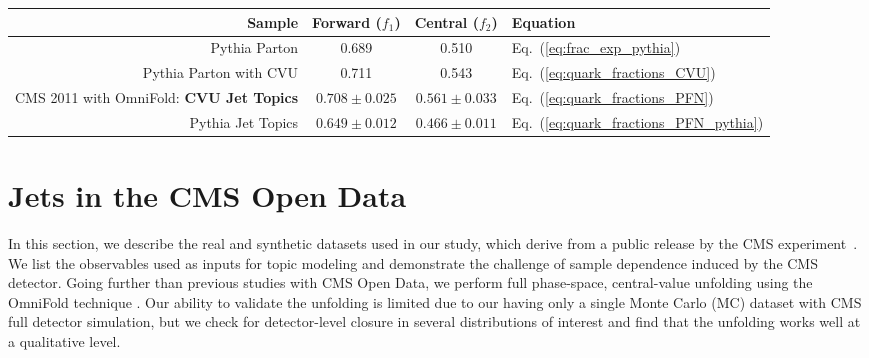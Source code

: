 \documentclass[aps,prd,twocolumn,preprintnumbers,nofootinbib,longbibliography,floatfix]{revtex4-1}
\DeclareRobustCommand{\App}[1]{App.~\ref{#1}}
\DeclareRobustCommand{\Eq}[1]{Eq.~(\ref{#1})}
\newcommand{\Pythia}{{\sc Pythia}\xspace}
\newcommand{\OmniFold}{{\sc OmniFold}\xspace}
\begin{document}
\begin{table*}
%
\renewcommand\arraystretch{1.1}
\setlength{\tabcolsep}{12pt}
\begin{tabular}{r c c l}
\hline
\hline
Sample & Forward ($f_1$) & Central ($f_2$) & Equation\\
 \hline
 \hline
\Pythia Parton & 0.689 & 0.510 & \Eq{eq:frac_exp_pythia}\\
\Pythia Parton with CVU & 0.711 & 0.543 & \Eq{eq:quark_fractions_CVU} \\
CMS 2011 with \OmniFold: \textbf{CVU Jet Topics} & $\mathbf{0.708 \pm 0.025}$ & $\mathbf{0.561 \pm 0.033}$ &\Eq{eq:quark_fractions_PFN}\\
\hline
\Pythia Jet Topics & $0.649 \pm 0.012$ & $0.466\pm 0.011$ & \Eq{eq:quark_fractions_PFN_pythia}\\
\hline
\hline
\end{tabular}
%
\caption{Various quark fractions used in this analysis.
%
The first row correspond to parton labels, as determined by \Pythia.
%
The second row is also from \Pythia but includes weights from central value unfolding; this is a parton-level reference that can be compared to our jet topics result.
%
The third row (in bold) is the main result from our study, using jet topics to extract an operational definition of ``quark'' fractions in the central-value-unfolded CMS 2011 Open Data.
%
The fourth row, studied in \App{sec:pythia_only_analysis}, comes from performing the jet topics procedure on the \Pythia Monte Carlo samples.
}
\label{tab:fractions}
\end{table*}

\section{Jets in the CMS Open Data}
\label{sec:cmsod}


In this section, we describe the real and synthetic datasets used in our study, which derive from a public release by the CMS experiment~\cite{CMS:JetPrimary2011A}.
%
We list the observables used as inputs for topic modeling and demonstrate the challenge of sample dependence induced by the CMS detector.
%
Going further than previous studies with CMS Open Data, we perform full phase-space, central-value unfolding using the \OmniFold technique \cite{Andreassen:2019cjw,Andreassen:2021zzk}.
%
Our ability to validate the unfolding is limited due to our having only a single Monte Carlo (MC) dataset with CMS full detector simulation, but we check for detector-level closure in several distributions of interest and find that the unfolding works well at a qualitative level.
\end{document}
